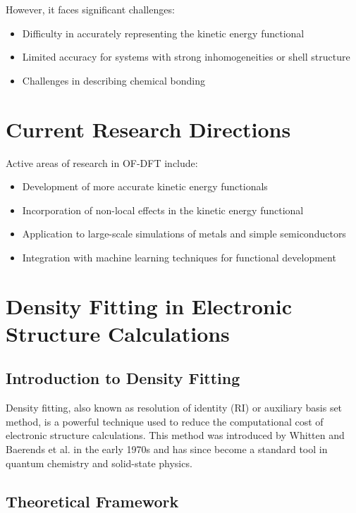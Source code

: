 However, it faces significant challenges:

\begin{itemize}
    \item Difficulty in accurately representing the kinetic energy functional
    \item Limited accuracy for systems with strong inhomogeneities or shell structure
    \item Challenges in describing chemical bonding
\end{itemize}

\section{Current Research Directions}

Active areas of research in OF-DFT include:

\begin{itemize}
    \item Development of more accurate kinetic energy functionals
    \item Incorporation of non-local effects in the kinetic energy functional
    \item Application to large-scale simulations of metals and simple semiconductors
    \item Integration with machine learning techniques for functional development
\end{itemize}

\section{Density Fitting in Electronic Structure Calculations}

\subsection{Introduction to Density Fitting}

Density fitting, also known as resolution of identity (RI) or auxiliary basis set method, is a powerful technique used to reduce the computational cost of electronic structure calculations. This method was introduced by Whitten \cite{Whitten1973} and Baerends et al. \cite{Baerends1973} in the early 1970s and has since become a standard tool in quantum chemistry and solid-state physics.

\subsection{Theoretical Framework}

